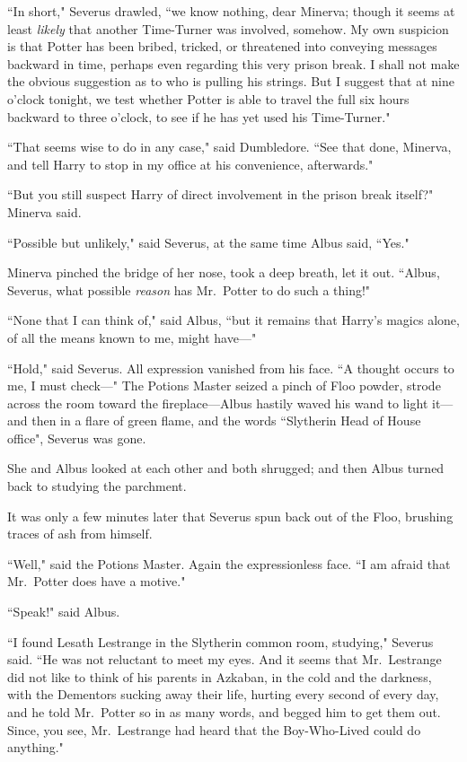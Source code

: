 ``In short," Severus drawled, ``we know nothing, dear Minerva; though it seems at least \emph{likely} that another Time-Turner was involved, somehow. My own suspicion is that Potter has been bribed, tricked, or threatened into conveying messages backward in time, perhaps even regarding this very prison break. I shall not make the obvious suggestion as to who is pulling his strings. But I suggest that at nine o'clock tonight, we test whether Potter is able to travel the full six hours backward to three o'clock, to see if he has yet used his Time-Turner."

``That seems wise to do in any case," said Dumbledore. ``See that done, Minerva, and tell Harry to stop in my office at his convenience, afterwards."

``But you still suspect Harry of direct involvement in the prison break itself?" Minerva said.

``Possible but unlikely," said Severus, at the same time Albus said, ``Yes."

Minerva pinched the bridge of her nose, took a deep breath, let it out. ``Albus, Severus, what possible \emph{reason} has Mr.~Potter to do such a thing!"

``None that I can think of," said Albus, ``but it remains that Harry's magics alone, of all the means known to me, might have—"

``Hold," said Severus. All expression vanished from his face. ``A thought occurs to me, I must check—" The Potions Master seized a pinch of Floo powder, strode across the room toward the fireplace—Albus hastily waved his wand to light it—and then in a flare of green flame, and the words ``Slytherin Head of House office", Severus was gone.

She and Albus looked at each other and both shrugged; and then Albus turned back to studying the parchment.

It was only a few minutes later that Severus spun back out of the Floo, brushing traces of ash from himself.

``Well," said the Potions Master. Again the expressionless face. ``I am afraid that Mr.~Potter does have a motive."

``Speak!" said Albus.

``I found Lesath Lestrange in the Slytherin common room, studying," Severus said. ``He was not reluctant to meet my eyes. And it seems that Mr.~Lestrange did not like to think of his parents in Azkaban, in the cold and the darkness, with the Dementors sucking away their life, hurting every second of every day, and he told Mr.~Potter so in as many words, and begged him to get them out. Since, you see, Mr.~Lestrange had heard that the Boy-Who-Lived could do anything."

